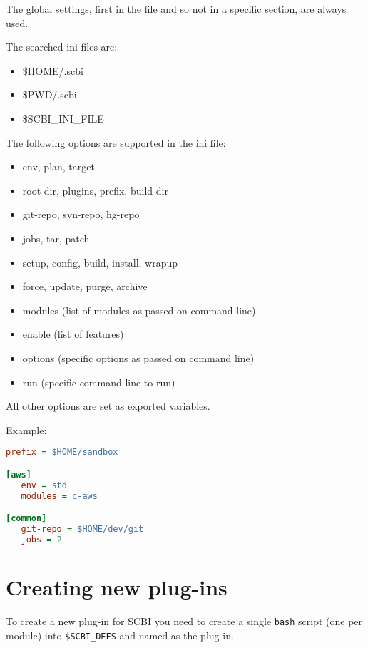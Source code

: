 \documentclass[a4paper,12pt,twoside]{article}
\newcommand{\code}[1]{\texttt{#1}}
\let\stdsection\section
\renewcommand\section{\newpage\stdsection}
\begin{document}
The global settings, first in the file and so not in a specific section, are always used.

The searched ini files are:

\begin{itemize}
	\item \$HOME/.scbi
	\item \$PWD/.scbi
	\item \$SCBI\_INI\_FILE
\end{itemize}

The following options are supported in the ini file:

\begin{itemize}
	\item env, plan, target
	\item root-dir, plugins, prefix, build-dir
	\item git-repo, svn-repo, hg-repo
	\item jobs, tar, patch
	\item setup, config, build, install, wrapup
	\item force, update, purge, archive
	\item modules (list of modules as passed on command line)
	\item enable (list of features)
	\item options (specific options as passed on command line)
	\item run (specific command line to run)
\end{itemize}

All other options are set as exported variables.

Example:

\begin{lstlisting}[language={Ini}]
prefix = $HOME/sandbox

[aws]
   env = std
   modules = c-aws

[common]
   git-repo = $HOME/dev/git
   jobs = 2
\end{lstlisting}


\section{Creating new plug-ins}

To create a new plug-in for SCBI you need to create a single \code{bash} script (one per module) into \code{\$SCBI\_DEFS} and named as the plug-in.
\end{document}
